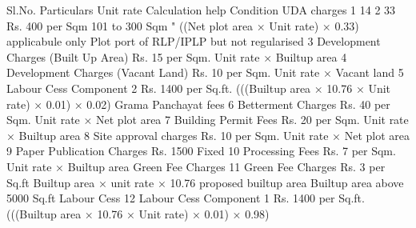 Sl.No.	Particulars	Unit rate	Calculation help	Condition
	UDA charges			
1	14%
2	33%
Rs. 400 per Sqm 101 to 300 Sqm  "	((Net plot area × Unit rate) × 0.33)	applicabule only Plot port of RLP/IPLP but not regularised
3	Development Charges (Built Up Area)	Rs. 15 per Sqm.	Unit rate × Builtup area	
4	Development Charges (Vacant Land)	Rs. 10 per Sqm.	Unit rate × Vacant land	
5	Labour Cess Component 2	Rs. 1400 per Sq.ft.	(((Builtup area × 10.76 × Unit rate) × 0.01) × 0.02)	
	Grama Panchayat fees			
6	Betterment Charges	Rs. 40 per Sqm.	Unit rate × Net plot area	
7	Building Permit Fees	Rs. 20 per Sqm.	Unit rate × Builtup area	
8	Site approval charges	Rs. 10 per Sqm.	Unit rate × Net plot area	
9	Paper Publication Charges	Rs. 1500	Fixed	
10	Processing Fees	Rs. 7 per Sqm.	Unit rate × Builtup area	
	Green Fee Charges			
11	Green Fee Charges	Rs. 3 per Sq.ft	Builtup area × unit rate × 10.76	proposed builtup area Builtup area above 5000 Sq.ft
	Labour Cess 			
12	Labour Cess Component 1	Rs. 1400 per Sq.ft.	(((Builtup area × 10.76 × Unit rate) × 0.01) × 0.98)	
